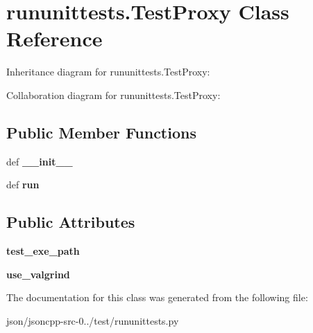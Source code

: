 \hypertarget{classrununittests_1_1_test_proxy}{\section{rununittests.\+Test\+Proxy Class Reference}
\label{classrununittests_1_1_test_proxy}
}


Inheritance diagram for rununittests.\+Test\+Proxy\+:


Collaboration diagram for rununittests.\+Test\+Proxy\+:
\subsection*{Public Member Functions}
\begin{DoxyCompactItemize}
\item 
\hypertarget{classrununittests_1_1_test_proxy_ae00671fbaa04a84c9ba3763dc6aaf5cb}{def {\bfseries \+\_\+\+\_\+init\+\_\+\+\_\+}}\label{classrununittests_1_1_test_proxy_ae00671fbaa04a84c9ba3763dc6aaf5cb}

\item 
\hypertarget{classrununittests_1_1_test_proxy_ab7cffd3af126bfcb859f36003385bb6d}{def {\bfseries run}}\label{classrununittests_1_1_test_proxy_ab7cffd3af126bfcb859f36003385bb6d}

\end{DoxyCompactItemize}
\subsection*{Public Attributes}
\begin{DoxyCompactItemize}
\item 
\hypertarget{classrununittests_1_1_test_proxy_afeb45a7a6aaf277941ffef96fa4f279a}{{\bfseries test\+\_\+exe\+\_\+path}}\label{classrununittests_1_1_test_proxy_afeb45a7a6aaf277941ffef96fa4f279a}

\item 
\hypertarget{classrununittests_1_1_test_proxy_a800e60a6247c59e669e4b920bd4827a0}{{\bfseries use\+\_\+valgrind}}\label{classrununittests_1_1_test_proxy_a800e60a6247c59e669e4b920bd4827a0}

\end{DoxyCompactItemize}


The documentation for this class was generated from the following file\+:\begin{DoxyCompactItemize}
\item 
json/jsoncpp-\/src-\/0../test/rununittests.\+py\end{DoxyCompactItemize}
